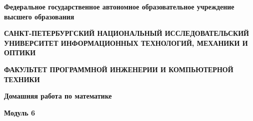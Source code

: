 \documentclass[12pt]{article}
\begin{document}
	\pagestyle{empty}
	
	\begin{center}
		\normalsize
		\textbf{Федеральное государственное автономное образовательное учреждение высшего образования}

		\small
		\medskip 
		\textbf{САНКТ-ПЕТЕРБУРГСКИЙ НАЦИОНАЛЬНЫЙ ИССЛЕДОВАТЕЛЬСКИЙ  УНИВЕРСИТЕТ ИНФОРМАЦИОННЫХ ТЕХНОЛОГИЙ, МЕХАНИКИ И ОПТИКИ}

		\medskip 
		\textbf{ФАКУЛЬТЕТ ПРОГРАММНОЙ ИНЖЕНЕРИИ И КОМПЬЮТЕРНОЙ ТЕХНИКИ}	
	\bigskip\bigskip\bigskip\bigskip\bigskip\bigskip\bigskip\bigskip\bigskip\bigskip\bigskip\bigskip	
		\par\medskip\par\smallskip\par\smallskip
		\Large 
		\textbf{Домашняя работа по математике} 

		\textbf{Модуль 6}


\end{center}
\end{document}
